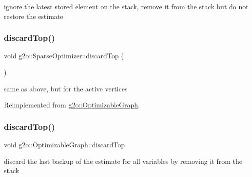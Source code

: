 ignore the latest stored element on the stack, remove it from the stack but do not restore the estimate 

\mbox{\label{classg2o_1_1_sparse_optimizer_a20ed9e9f1201bfb874456a8d30f169fb}} 
\subsubsection{\texorpdfstring{discard\+Top()}{discardTop()}\hspace{0.1cm}{\footnotesize\ttfamily [2/4]}}
{\footnotesize\ttfamily void g2o\+::\+Sparse\+Optimizer\+::discard\+Top (\begin{DoxyParamCaption}{ }\end{DoxyParamCaption})\hspace{0.3cm}{\ttfamily [virtual]}}



same as above, but for the active vertices 



Reimplemented from \mbox{\hyperlink{structg2o_1_1_optimizable_graph_a368b5f22dbc57abd2f651a20d039f61c}{g2o\+::\+Optimizable\+Graph}}.

\mbox{\label{classg2o_1_1_sparse_optimizer_a368b5f22dbc57abd2f651a20d039f61c}} 
\subsubsection{\texorpdfstring{discard\+Top()}{discardTop()}\hspace{0.1cm}{\footnotesize\ttfamily [3/4]}}
{\footnotesize\ttfamily void g2o\+::\+Optimizable\+Graph\+::discard\+Top}



discard the last backup of the estimate for all variables by removing it from the stack 

\mbox{\label{classg2o_1_1_sparse_optimizer_a74cbd91a3e05c1f497b4675b0e70113a}} 
